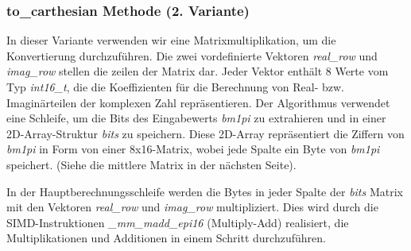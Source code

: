\documentclass[course=erap]{aspdoc}
\begin{document}
    \subsubsection{to\_carthesian Methode (2. Variante)}
    In dieser Variante verwenden wir eine Matrixmultiplikation, um die Konvertierung durchzuführen.
    Die zwei vordefinierte Vektoren \textit{real\_row} und \textit{imag\_row} stellen die zeilen der Matrix dar.
    Jeder Vektor enthält 8 Werte vom Typ \textit{int16\_t}, die die Koeffizienten für die Berechnung von Real- bzw. Imaginärteilen der komplexen Zahl repräsentieren.
    Der Algorithmus verwendet eine Schleife, um die Bits des Eingabewerts \textit{bm1pi} zu extrahieren und in einer 2D-Array-Struktur \textit{bits} zu speichern.
    Diese 2D-Array repräsentiert die Ziffern von \textit{bm1pi} in Form von einer 8x16-Matrix, wobei jede Spalte ein Byte von \textit{bm1pi} speichert.
    (Siehe die mittlere Matrix in der nächsten Seite).

    In der Hauptberechnungsschleife werden die Bytes in jeder Spalte der \textit{bits} Matrix mit den Vektoren \textit{real\_row} und \textit{imag\_row} multipliziert.
    Dies wird durch die SIMD-Instruktionen \textit{\_mm\_madd\_epi16} (Multiply-Add) realisiert, die Multiplikationen und Additionen in einem Schritt durchzuführen.
\end{document}
